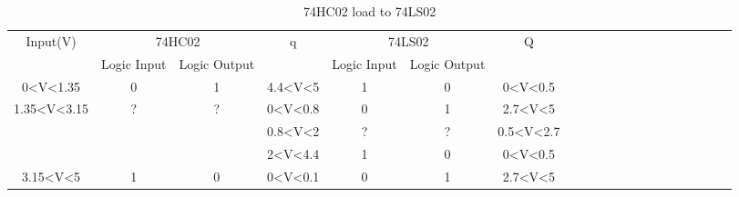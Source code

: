 	\begin{center}
	\begin{table}[h!]
	\begin{tabular}{llllllllllllllllllll}
	\cline{1-7}
	\multicolumn{1}{|c|}{\multirow{2}{*}{Input(V)}}                                & \multicolumn{2}{c|}{74HC02}                                                       & \multicolumn{1}{c|}{\multirow{2}{*}{q}}          & \multicolumn{2}{c|}{74LS02}                                          & \multicolumn{1}{c|}{\multirow{2}{*}{Q}}             \\ \cline{2-3} \cline{5-6}
	\multicolumn{1}{|c|}{}                                                 & \multicolumn{1}{c|}{Logic Input}        & \multicolumn{1}{c|}{Logic Output}       & \multicolumn{1}{c|}{}                            & \multicolumn{1}{c|}{Logic Input} & \multicolumn{1}{c|}{Logic Output} & \multicolumn{1}{c|}{}                               \\ \cline{1-7}
	\multicolumn{1}{|c|}{0\textless{}V\textless{}1.35}                     & \multicolumn{1}{c|}{0}                  & \multicolumn{1}{c|}{1}                  & \multicolumn{1}{c|}{4.4\textless{}V\textless{}5} & \multicolumn{1}{c|}{1}           & \multicolumn{1}{c|}{0}            & \multicolumn{1}{c|}{0\textless{}V\textless{}0.5}    \\ \cline{1-7}
	\multicolumn{1}{|c|}{\multirow{3}{*}{1.35\textless{}V\textless{}3.15}} & \multicolumn{1}{c|}{\multirow{3}{*}{?}} & \multicolumn{1}{c|}{\multirow{3}{*}{?}} & \multicolumn{1}{c|}{0\textless{}V\textless{}0.8} & \multicolumn{1}{c|}{0}           & \multicolumn{1}{c|}{1}            & \multicolumn{1}{c|}{2.7\textless{}V\textless{}5}    \\ \cline{4-7}
	\multicolumn{1}{|c|}{}                                                 & \multicolumn{1}{c|}{}                   & \multicolumn{1}{c|}{}                   & \multicolumn{1}{c|}{0.8\textless{}V\textless{}2} & \multicolumn{1}{c|}{?}           & \multicolumn{1}{c|}{?}            & \multicolumn{1}{c|}{0.5\textless{}V\textless{}2.7}  \\ \cline{4-7}
	\multicolumn{1}{|c|}{}                                                 & \multicolumn{1}{c|}{}                   & \multicolumn{1}{c|}{}                   & \multicolumn{1}{c|}{2\textless{}V\textless{}4.4} & \multicolumn{1}{c|}{1}           & \multicolumn{1}{c|}{0}            & \multicolumn{1}{c|}{0\textless{}V\textless{}0.5}    \\ \cline{1-7}
	\multicolumn{1}{|c|}{3.15\textless{}V\textless{}5}                     & \multicolumn{1}{c|}{1}                  & \multicolumn{1}{c|}{0}                  & \multicolumn{1}{c|}{0\textless{}V\textless{}0.1} & \multicolumn{1}{c|}{0}           & \multicolumn{1}{c|}{1}            & \multicolumn{1}{c|}{2.7\textless{}V\textless{}5}\\ \cline{1-7}
	\end{tabular}
	\caption{\color{cyan}74HC02 load to 74LS02}
	\label{fig:ej2thhctols}
	\end{table}
	\end{center}
	

